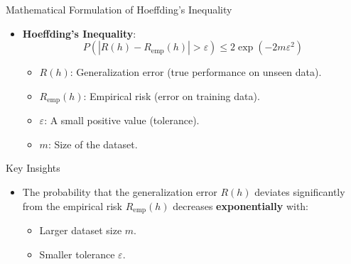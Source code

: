 \documentclass[
  ignorenonframetext,
]{beamer}
\providecommand{\tightlist}{%
  \setlength{\itemsep}{0pt}\setlength{\parskip}{0pt}}\usepackage{longtable,booktabs,array}
\begin{document}
\begin{frame}{Mathematical Formulation of Hoeffding's Inequality}
\label{mathematical-formulation-of-hoeffdings-inequality}
\begin{itemize}
\tightlist
\item
  \textbf{Hoeffding's Inequality}: \[
  P(|R(h) - R_{\text{emp}}(h)| > \varepsilon) \leq 2 \exp(-2m\varepsilon^2)
  \]

  \begin{itemize}
  \tightlist
  \item
    \(R(h)\): Generalization error (true performance on unseen data).
  \item
    \(R_{\text{emp}}(h)\): Empirical risk (error on training data).
  \item
    \(\varepsilon\): A small positive value (tolerance).
  \item
    \(m\): Size of the dataset.
  \end{itemize}
\end{itemize}
\end{frame}

\begin{frame}
\begin{block}{Key Insights}
\label{key-insights}
\begin{itemize}
\tightlist
\item
  The probability that the generalization error \(R(h)\) deviates
  significantly from the empirical risk \(R_{\text{emp}}(h)\) decreases
  \textbf{exponentially} with:

  \begin{itemize}
  \tightlist
  \item
    Larger dataset size \(m\).
  \item
    Smaller tolerance \(\varepsilon\).
  \end{itemize}
\end{itemize}
\end{block}
\end{frame}
\end{document}

